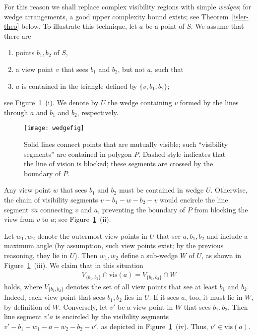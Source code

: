 \documentclass[11pt]{article}
\begin{document}
For this reason we shall replace complex visibility regions with simple {\em wedges};
for wedge arrangements, a good upper complexity bound exists; see Theorem~\ref{isler-theo} below.
To illustrate this technique, let $a$ be a point of $S$. We assume that there are 
\begin{enumerate}
\item  points $b_1, b_2$ of $S$,
\item  a view point $v$ that sees $b_1$ and $b_2$, but not $a$, such that
\item  $a$ is contained in the  triangle defined by $\{v,b_1,b_2\}$;
\end{enumerate}
see Figure~\ref{wedge-fig}~(i). We denote by $U$ the wedge containing $v$ formed 
by the lines through $a$ and $b_1$ and $b_2$, respectively.
\begin{figure}[hbtp]\begin{center}\texttt{[image: wedgefig]}\caption{Solid lines connect points that are mutually visible; such ``visibility segments''  
    are contained in polygon $P$. Dashed style indicates that the line of vision
    is blocked; these segments are crossed by the boundary of $P$.}\label{wedge-fig}
  \end{center}\end{figure}
Any view point $w$ that sees $b_1$ and $b_2$ must be contained in wedge $U$. Otherwise, the chain of
visibility segments $v-b_1-w-b_2-v$ would encircle the line segment $\overline{va}$ connecting $v$ and $a$, 
preventing the boundary of $P$ from blocking the view from $v$ to $a$; see Figure~\ref{wedge-fig}~(ii). 

Let $w_1, w_2$ denote the outermost view points in $U$ that see $a, b_1, b_2$ and include a maximum angle
(by assumption, such view points exist; by the previous reasoning, they lie in $U$).
Then $w_1, w_2$ define a sub-wedge $W$ of $U$, as shown in Figure~\ref{wedge-fig}~(iii). 
We claim that in this situation
\begin{eqnarray}        \label{wedge-fact}
V_{\{b_1,b_2\}} \cap \mbox{vis}(a) = V_{\{b_1,b_2\}} \cap W
\end{eqnarray}
holds, where $V_{\{b_1,b_2\}}$ denotes the set of all view points that see at least $b_1$ and $b_2$.
Indeed, each view point that sees $b_1, b_2$ lies in $U$. If it sees $a$, too, it must lie in $W$,
by definition of $W$. Conversely, let $v'$ be a view point in $W$ that sees $b_1, b_2$. Then line segment
$\overline{v'a}$ is encircled by the visibility segments $v'-b_1-w_1-a-w_2-b_2-v'$,
as depicted in Figure~\ref{wedge-fig}~(iv). Thus, $v' \in \mbox{vis}(a)$.
\end{document}
